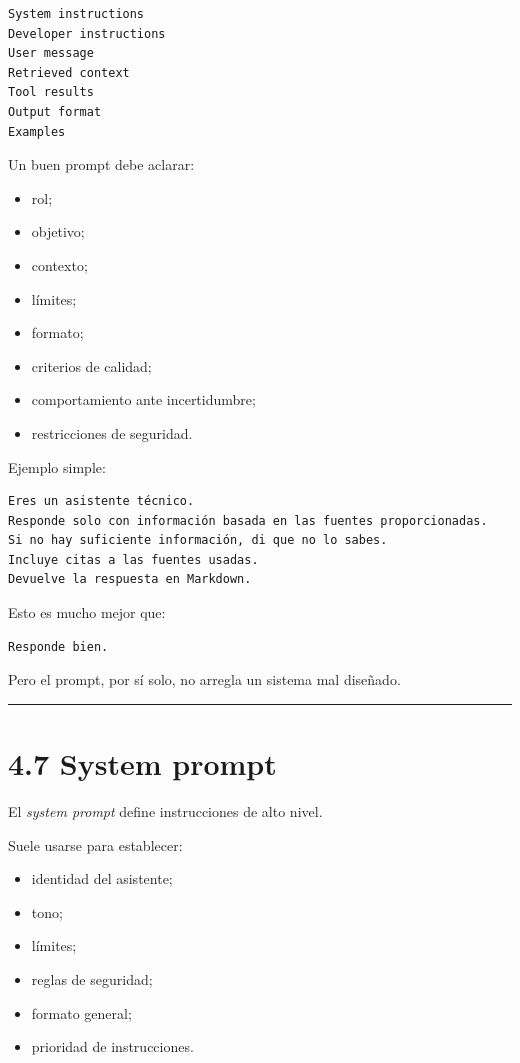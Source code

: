 \begin{lstlisting}
System instructions
Developer instructions
User message
Retrieved context
Tool results
Output format
Examples
\end{lstlisting}

Un buen prompt debe aclarar:

\begin{itemize}
\tightlist
\item
  rol;
\item
  objetivo;
\item
  contexto;
\item
  límites;
\item
  formato;
\item
  criterios de calidad;
\item
  comportamiento ante incertidumbre;
\item
  restricciones de seguridad.
\end{itemize}

Ejemplo simple:

\begin{lstlisting}
Eres un asistente técnico.
Responde solo con información basada en las fuentes proporcionadas.
Si no hay suficiente información, di que no lo sabes.
Incluye citas a las fuentes usadas.
Devuelve la respuesta en Markdown.
\end{lstlisting}

Esto es mucho mejor que:

\begin{lstlisting}
Responde bien.
\end{lstlisting}

Pero el prompt, por sí solo, no arregla un sistema mal diseñado.

\begin{center}\rule{0.5\linewidth}{0.5pt}\end{center}

\section{4.7 System prompt}\label{system-prompt}

El \emph{system prompt} define instrucciones de alto nivel.

Suele usarse para establecer:

\begin{itemize}
\tightlist
\item
  identidad del asistente;
\item
  tono;
\item
  límites;
\item
  reglas de seguridad;
\item
  formato general;
\item
  prioridad de instrucciones.
\end{itemize}

